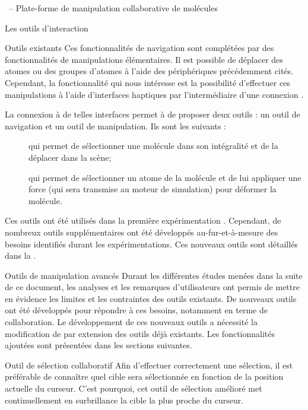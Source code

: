 \documentclass[myfrancais,ngerman,english,frenchb]{mythesis}
\begin{document}
\begin{mychapter}{\myShaddock\ -- Plate-forme de manipulation collaborative de molécules}
\begin{mysection}{Les outils d'interaction}
\begin{mysubsection}{Outils existants}
				Ces fonctionnalités de navigation sont complétées par des fonctionnalités de manipulations élémentaires.
				Il est possible de déplacer des atomes ou des groupes d'atomes à l'aide des périphériques précédemment cités.
				Cependant, la fonctionnalité qui nous intéresse est la possibilité d'effectuer ces manipulations à l'aide d'interfaces haptiques par l'intermédiaire d'une connexion  .

				La connexion à de telles interfaces permet à  de proposer deux outils : un outil de navigation et un outil de manipulation.
				Ils sont les suivants :
				\begin{description}
					\item[] qui permet de sélectionner une molécule dans son intégralité et de la déplacer dans la scène;
					\item[] qui permet de sélectionner un atome de la molécule et de lui appliquer une force (qui sera transmise au moteur de simulation) pour déformer la molécule.
				\end{description}
				Ces outils ont été utilisés dans la première expérimentation .
				Cependant, de nombreux outils supplémentaires ont été développés au-fur-et-à-mesure des besoins identifiés durant les expérimentations.
				Ces nouveaux outils sont détaillés dans la .
			\end{mysubsection}
			\begin{mysubsection}{Outils de manipulation avancés}
				Durant les différentes études menées dans la suite de ce document, les analyses et les remarques d'utilisateurs ont permis de mettre en évidence les limites et les contraintes des outils existants.
				De nouveaux outils ont été développés pour répondre à ces besoins, notamment en terme de collaboration.
				Le développement de ces nouveaux outils a nécessité la modification de  par extension des outils déjà existants.
				Les fonctionnalités ajoutées sont présentées dans les sections suivantes.
				\begin{mysubsubsection}{Outil de sélection collaboratif}
					Afin d'effectuer correctement une sélection, il est préférable de connaître \myapriori quel cible sera sélectionnée en fonction de la position actuelle du curseur.
					C'est pourquoi, cet outil de sélection amélioré met continuellement en surbrillance la cible la plus proche du curseur.

\end{mysubsubsection}
\end{mysubsection}
\end{mysection}
\end{mychapter}
\end{document}
